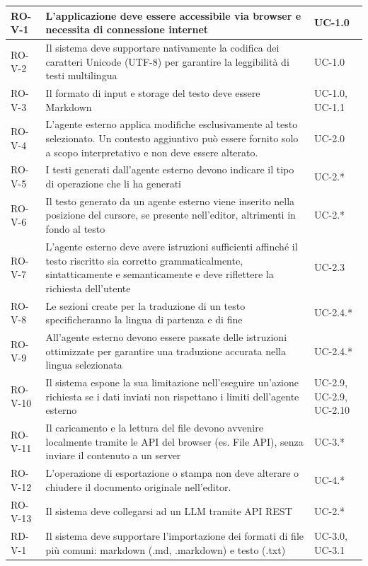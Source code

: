 \documentclass[11pt,a4paper]{article}
\begin{document}
\begin{longtable}{|p{}|>{\raggedright\arraybackslash}p{}|p{}|}
RO-V-1 & L'applicazione deve essere accessibile via browser e necessita di connessione internet & UC-1.0 \\
\hline
RO-V-2 & Il sistema deve supportare nativamente la codifica dei caratteri Unicode (UTF-8) per garantire la leggibilità di testi multilingua & UC-1.0 \\
\hline
RO-V-3 & Il formato di input e storage del testo deve essere Markdown & UC-1.0, UC-1.1 \\
\hline
RO-V-4 & L’agente esterno applica modifiche esclusivamente al testo selezionato. Un contesto aggiuntivo può essere fornito solo a scopo interpretativo e non deve essere alterato. & UC-2.0 \\
\hline
RO-V-5 & I testi generati dall'agente esterno devono indicare il tipo di operazione che li ha generati & UC-2.* \\
\hline
RO-V-6 & Il testo generato da un agente esterno viene inserito nella posizione del cursore, se presente nell’editor, altrimenti in fondo al testo & UC-2.* \\
\hline
RO-V-7 & L'agente esterno deve avere istruzioni sufficienti affinché il testo riscritto sia corretto grammaticalmente, sintatticamente e semanticamente e deve riflettere la richiesta dell'utente & UC-2.3 \\
\hline
RO-V-8 & Le sezioni create per la traduzione di un testo specificheranno la lingua di partenza e di fine & UC-2.4.* \\
\hline
RO-V-9 & All'agente esterno devono essere passate delle istruzioni ottimizzate per garantire una traduzione accurata nella lingua selezionata & UC-2.4.* \\
\hline
RO-V-10 & Il sistema espone la sua limitazione nell'eseguire un'azione richiesta se i dati inviati non rispettano i limiti dell'agente esterno & UC-2.9, UC-2.9, UC-2.10 \\
\hline
RO-V-11 & Il caricamento e la lettura del file devono avvenire localmente tramite le API del browser (es. File API), senza inviare il contenuto a un server & UC-3.* \\
\hline
RO-V-12 & L'operazione di esportazione o stampa non deve alterare o chiudere il documento originale nell'editor. & UC-4.* \\
\hline
RO-V-13 & Il sistema deve collegarsi ad un LLM tramite API REST & UC-2.* \\
\hline
RD-V-1 & Il sistema deve supportare l'importazione dei formati di file più comuni: markdown (.md, .markdown) e testo (.txt) & UC-3.0, UC-3.1 \\

\end{longtable}
\end{document}
